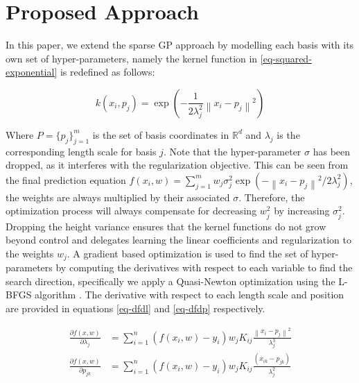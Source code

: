 \documentclass[useAMS,usenatbib,fleqn]{mn2e}
\begin{document}
\section{Proposed Approach}
\label{sec-proposed-approach}

In this paper, we extend the sparse GP approach by modelling each basis with its own set of hyper-parameters, namely the kernel function in \eqref{eq-squared-exponential} is redefined as follows:

\begin{equation}
\label{eq-squared-exponential-extension}
k(x_{i},p_{j}) = \exp{\left(-\frac{1}{2\lambda_{j}^{2}}\left\| x_{i}-p_{j}\right\|^{2}\right)}
\end{equation}

Where $P=\{p_{j}\}_{j=1}^{m}$ is the set of basis coordinates in $\mathbb{R}^{d}$ and $\lambda_{j}$ is the corresponding length scale for basis $j$. Note that the hyper-parameter $\sigma$ has been dropped, as it interferes with the regularization objective. This can be seen from the final prediction equation $f(x_{i},w)=\sum_{j=1}^{m}w_{j}\sigma_{j}^{2}\exp{\left(-\left\| x_{i}-p_{j}\right\|^{2}/2\lambda_{j}^{2}\right)}$, the weights are always multiplied by their associated $\sigma$. Therefore, the optimization process will always compensate for decreasing $w_{j}^{2}$ by increasing $\sigma_{j}^{2}$. Dropping the height variance ensures that the kernel functions do not grow beyond control and delegates learning the linear coefficients and regularization to the weights $w_{j}$. A gradient based optimization is used to find the set of hyper-parameters by computing the derivatives with respect to each variable to find the search direction, specifically we apply a Quasi-Newton optimization using the L-BFGS algorithm \cite{}. The derivative with respect to each length scale and position are provided in equations \eqref{eq-dfdl} and \eqref{eq-dfdp} respectively. 

\begin{subequations}
\begin{align} 
\label{eq-dfdl}
\frac{\partial f(x,w)}{\partial \lambda_{j}} &= \sum_{i=1}^{n}\left(f(x_{i},w)-y_{i}\right)w_{j}K_{ij}\frac{\left\| x_{i}-p_{j}\right\|^{2}}{\lambda_{j}^{3}}\\
\label{eq-dfdp}
\frac{\partial f(x,w)}{\partial p_{jk}} &= \sum_{i=1}^{n}\left(f(x_{i},w)-y_{i}\right)w_{j}K_{ij}\frac{(x_{ik}-p_{jk})}{\lambda_{j}^{2}}
\end{align}
\end{subequations}
\end{document}
